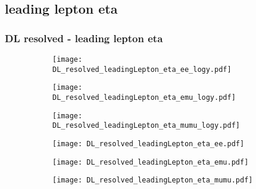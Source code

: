 \documentclass[aspectratio=169,8pt]{beamer}
\begin{document}
\subsection{leading lepton eta}
\begin{frame}
\frametitle{DL resolved - leading lepton eta}
\begin{figure}
\captionsetup[subfigure]{labelformat=empty}
\begin{subfigure}{0.32\textwidth}
\texttt{[image: DL\_resolved\_leadingLepton\_eta\_ee\_logy.pdf]}
\vspace*{-0.15cm}
\end{subfigure}
\hfil
\begin{subfigure}{0.32\textwidth}
\texttt{[image: DL\_resolved\_leadingLepton\_eta\_emu\_logy.pdf]}
\vspace*{-0.15cm}
\end{subfigure}
\hfil
\begin{subfigure}{0.32\textwidth}
\texttt{[image: DL\_resolved\_leadingLepton\_eta\_mumu\_logy.pdf]}
\vspace*{-0.15cm}
\end{subfigure}
\hfil
\begin{subfigure}{0.32\textwidth}
\texttt{[image: DL\_resolved\_leadingLepton\_eta\_ee.pdf]}
\vspace*{-0.15cm}
\end{subfigure}
\hfil
\begin{subfigure}{0.32\textwidth}
\texttt{[image: DL\_resolved\_leadingLepton\_eta\_emu.pdf]}
\vspace*{-0.15cm}
\end{subfigure}
\hfil
\begin{subfigure}{0.32\textwidth}
\texttt{[image: DL\_resolved\_leadingLepton\_eta\_mumu.pdf]}
\vspace*{-0.15cm}
\end{subfigure}
\hfil
\end{figure}
\end{frame}
\newpage
\end{document}

